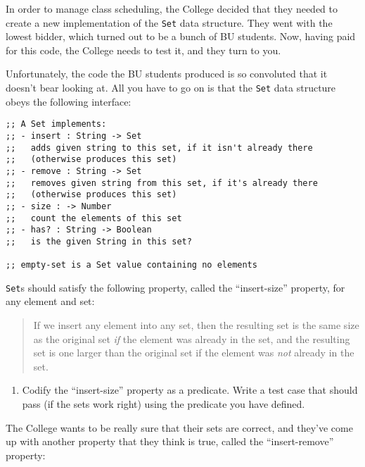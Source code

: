 \documentclass[12pt]{article}                   %
\def\pts#1{\marginpar{\footnotesize \raggedright  \fbox{#1 {\sc Points}}}}
\begin{document}
\begin{problem} \pts{15}

In order to manage class scheduling, the College decided that they
needed to create a new implementation of the \verb|Set| data
structure.  They went with the lowest bidder, which
turned out to be a bunch of BU students.  Now, having paid for this
code, the College needs to test it, and they turn to you.  

Unfortunately, the code the BU students produced is so convoluted that
it doesn't bear looking at.  All you have to go on is that the
\verb|Set| data structure obeys the following interface:

\begin{verbatim}
;; A Set implements:
;; - insert : String -> Set
;;   adds given string to this set, if it isn't already there
;;   (otherwise produces this set)
;; - remove : String -> Set
;;   removes given string from this set, if it's already there
;;   (otherwise produces this set)
;; - size : -> Number
;;   count the elements of this set
;; - has? : String -> Boolean
;;   is the given String in this set?

;; empty-set is a Set value containing no elements
\end{verbatim}
\noindent
\verb|Set|s should satisfy the following property, called the
``insert-size'' property, for any element and
set:

\begin{quote}
If we insert any element into any set, then the resulting set is the
same size as the original set \emph{if} the element was already in the
set, and the resulting set is one larger than the original set
if the element was \emph{not} already in the set.
\end{quote}

\begin{enumerate}
\item Codify the ``insert-size'' property as a predicate.  Write a
  test case that should pass (if the sets work right) using the
  predicate you have defined.
\end{enumerate}

\ifrubric\else
{}
\fi

\newpage
\noindent
The College wants to be really sure that their sets are correct, and
they've come up with another property that they think is true, called
the ``insert-remove'' property:


\end{problem}
\end{document}
